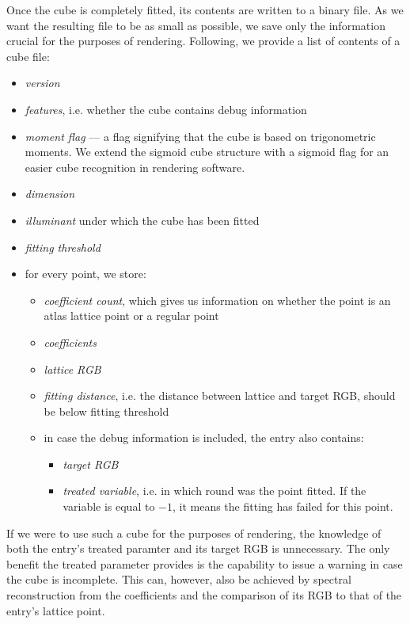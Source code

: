 Once the cube is completely fitted, its contents are written to a binary file. As we want the resulting file to be as small as possible, we save only the information crucial for the purposes of rendering. Following, we provide a list of contents of a cube file:
\begin{itemize}
	\item \emph{version}
	\item \emph{features}, i.e. whether the cube contains debug information
	\item \emph{moment flag} --- a flag signifying that the cube is based on trigonometric moments. We extend the sigmoid cube structure with a sigmoid flag for an easier cube recognition in rendering software.
	\item \emph{dimension}
	\item \emph{illuminant} under which the cube has been fitted
	\item \emph{fitting threshold}
	\item for every point, we store:
	\begin{itemize}
		\item \emph{coefficient count}, which gives us information on whether the point is an atlas lattice point or a regular point
		\item \emph{coefficients}
		\item \emph{lattice RGB}
		\item \emph{fitting distance}, i.e. the distance between lattice and target RGB, should be below fitting threshold
		\item in case the debug information is included, the entry also contains:
		\begin{itemize}
			\item \emph{target RGB}
			\item \emph{treated variable}, i.e. in which round was the point fitted. If the variable is equal to $-1$, it means the fitting has failed for this point.
		\end{itemize}
	\end{itemize}
\end{itemize}

If we were to use such a cube for the purposes of rendering, the knowledge of both the entry's treated paramter and its target RGB is unnecessary. The only benefit the treated parameter provides is the capability to issue a warning in case the cube is incomplete. This can, however, also be achieved by spectral reconstruction from the coefficients and the comparison of its RGB to that of the entry's lattice point.


